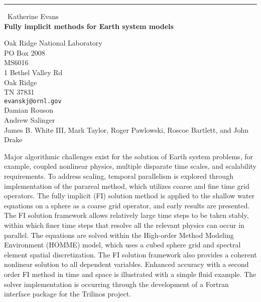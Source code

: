 \documentclass{report}
\begin{document}
\begin{center}
\rule{6in}{1pt} \
{\large Katherine Evans \\
{\bf Fully implicit methods for Earth system models}}

Oak Ridge National Laboratory \\ PO Box 2008 \\ MS6016 \\ 1 Bethel Valley Rd \\ Oak Ridge \\ TN 37831
\\
{\tt evanskj@ornl.gov}\\
Damian Rouson\\
Andrew Salinger\\
	James B. White III, Mark Taylor, Roger Pawlowski, Roscoe Bartlett, and John Drake\end{center}

Major algorithmic challenges exist for the solution of Earth system problems,
for example, coupled nonlinear physics, multiple disparate time scales, and
scalability requirements. To address scaling, temporal parallelism is explored
through implementation of the parareal method, which utilizes coarse and fine
time grid operators. The fully implicit (FI) solution method is applied to the
shallow water equations on a sphere as a coarse grid operator, and early results
are presented. The FI solution framework allows relatively large time steps to
be taken stably, within which finer time steps that resolve all the relevant
physics can occur in parallel. The equations are solved within the High-order
Method Modeling Environment (HOMME) model, which uses a cubed sphere grid and
spectral element spatial discretization. The FI solution framework also provides
a coherent nonlinear solution to all dependent variables. Enhanced accuracy with
a second order FI method in time and space is illustrated with a simple fluid
example. The solver implementation is occurring through the development of a
Fortran interface package for the Trilinos project.
\end{document}
